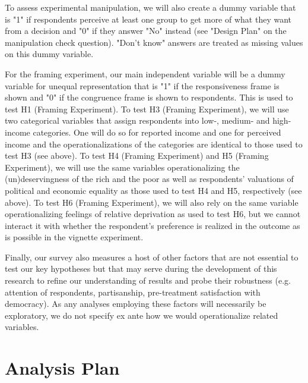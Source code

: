 \documentclass[12pt, letterpaper]{article}
\begin{document}
\begin{spacing}{1.5}
To assess experimental manipulation, we will also create a dummy variable that is "1" if respondents perceive at least one group to get more of what they want from a decision and "0" if they answer "No" instead (see "Design Plan" on the manipulation check question). "Don't know" answers are treated as missing values on this dummy variable.

For the framing experiment, our main independent variable will be a dummy variable for unequal representation that is "1" if the responsiveness frame is shown and "0" if the congruence frame is shown to respondents. This is used to test H1 (Framing Experiment). To test H3 (Framing Experiment), we will use two categorical variables that assign respondents into low-, medium- and high-income categories. One will do so for reported income and one for perceived income and the operationalizations of the categories are identical to those used to test H3 (see above). To test H4 (Framing Experiment) and H5 (Framing Experiment), we will use the same variables operationalizing the (un)deservingness of the rich and the poor as well as respondents' valuations of political and economic equality as those used to test H4 and H5, respectively (see above). To test H6 (Framing Experiment), we will also rely on the same variable operationalizing feelings of relative deprivation as used to test H6, but we cannot interact it with whether the respondent's preference is realized in the outcome as is possible in the vignette experiment.

Finally, our survey also measures a host of other factors that are not essential to test our key hypotheses but that may serve during the development of this research to refine our understanding of results and probe their robustness (e.g. attention of respondents, partisanship, pre-treatment satisfaction with democracy). As any analyses employing these factors will necessarily be exploratory, we do not specify ex ante how we would operationalize related variables.


\section*{Analysis Plan}


\end{spacing}
\end{document}

